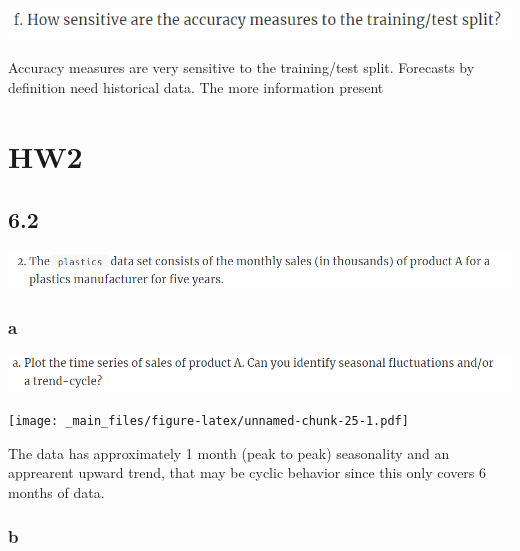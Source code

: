 \documentclass[]{book}
\newenvironment{Shaded}{\begin{snugshade}}{\end{snugshade}}
\newcommand{\KeywordTok}[1]{\textcolor[rgb]{0.13,0.29,0.53}{\textbf{#1}}}
\newcommand{\NormalTok}[1]{#1}
\newcommand{\OperatorTok}[1]{\textcolor[rgb]{0.81,0.36,0.00}{\textbf{#1}}}
\newcommand{\StringTok}[1]{\textcolor[rgb]{0.31,0.60,0.02}{#1}}
\begin{document}
\includegraphics{./week1/3.8f.png}

Accuracy measures are very sensitive to the training/test split. Forecasts by definition need historical data. The more information present

\hypertarget{hw2}{%
\chapter{HW2}\label{hw2}}

\hypertarget{section-5}{%
\section{6.2}\label{section-5}}

\includegraphics{./week2/6.2.png}

\hypertarget{a-2}{%
\subsection{a}\label{a-2}}

\includegraphics{./week2/6.2a.png}

\begin{Shaded}
\end{Shaded}

\texttt{[image: \_main\_files/figure-latex/unnamed-chunk-25-1.pdf]}

The data has approximately 1 month (peak to peak) seasonality and an apprearent upward trend, that may be cyclic behavior since this only covers 6 months of data.

\hypertarget{b-2}{%
\subsection{b}\label{b-2}}
\end{document}
